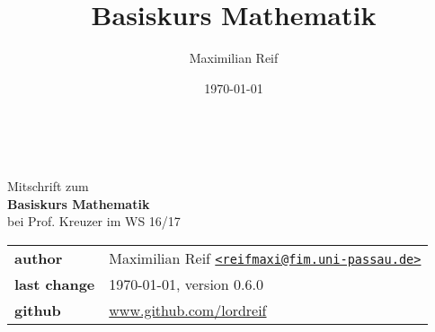\documentclass[11pt,a4paper,ngerman]{article}
\date{\today}
\author{Maximilian Reif}
\title{Basiskurs Mathematik}
\begin{document}
\begin{titlepage}
    \ \newline\newline\newline\newline\newline
	\begin{center}
		\huge Mitschrift zum \\
		\Huge \textbf{Basiskurs Mathematik} \\
		\huge bei Prof. Kreuzer im WS 16/17 \\
		\normalsize

		\vspace{1cm}
		\begin{tabular}[b]{l|l}
			\textbf{author} & Maximilian Reif \texttt{\href{mailto:reifmaxi@fim.uni-passau.de}
			{<reifmaxi@fim.uni-passau.de>}} \\
			\textbf{last change} & \today, version 0.6.0 \\
			\textbf{github} & \url{www.github.com/lordreif}
		\end{tabular}

		\vspace{1cm}
		
	\end{center}
   
	
\end{titlepage}

\setcounter{page}{2}

\newpage
\tableofcontents \thispagestyle{empty}
\newpage







%
%
%
%
%
\setcounter{section}{11}

\end{document}
